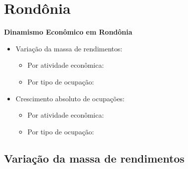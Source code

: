 \documentclass[8pt]{beamer}
\begin{document}
\begin{frame}
\textit{\hyperlink{indice_principal_amz_pa}{}}

\end{frame}

\begin{frame}
\textit{\hyperlink{indice_principal_amz_pa}{}}

\end{frame}

\section{Rondônia}

\begin{frame}[label=indice_principal_amz_ro]{}

\textit{\hyperlink{indice_principal}{}}

\textbf{Dinamismo Econômico em Rondônia}
\vspace{2mm}

\begin{itemize}

\item{Variação da massa de rendimentos:
	\begin{itemize}
	\item{Por atividade econômica: \hyperlink{amzrorkngvmassaporcnae2dig}{}}
	\item{Por tipo de ocupação: \hyperlink{amzrorkngvmassaporcod2dig}{}}
	\end{itemize}
}
\vspace{1mm}

\item{Crescimento  absoluto de ocupações:
	\begin{itemize}
	\item{Por atividade econômica: \hyperlink{amzrorkngnocuporcnae2dig}{}}
	\item{Por tipo de ocupação: \hyperlink{amzrorkngnocuporcod2dig}{}}
	\end{itemize}
}
\vspace{1mm}

\end{itemize}

\end{frame}


\subsection{Variação da massa de rendimentos}
\end{document}
